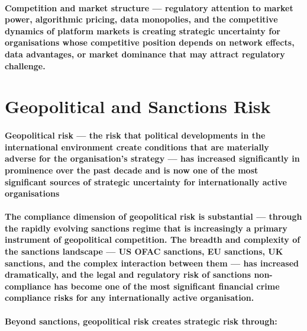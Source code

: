 \paragraph{\textbf{Competition and market structure} — regulatory attention to market power, algorithmic pricing, data monopolies, and the competitive dynamics of platform markets is creating strategic uncertainty for organisations whose competitive position depends on network effects, data advantages, or market dominance that may attract regulatory challenge.}

\section{Geopolitical and Sanctions Risk}
\paragraph{\textbf{Geopolitical risk} — the risk that political developments in the international environment create conditions that are materially adverse for the organisation's strategy — has increased significantly in prominence over the past decade and is now one of the most significant sources of strategic uncertainty for internationally active organisations}
\paragraph{The compliance dimension of geopolitical risk is substantial — through the rapidly evolving \textbf{sanctions regime} that is increasingly a primary instrument of geopolitical competition. The breadth and complexity of the sanctions landscape — US OFAC sanctions, EU sanctions, UK sanctions, and the complex interaction between them — has increased dramatically, and the legal and regulatory risk of sanctions non-compliance has become one of the most significant financial crime compliance risks for any internationally active organisation.}
\paragraph{Beyond sanctions, geopolitical risk creates strategic risk through:}
\begin{itemize}
\end{itemize}

